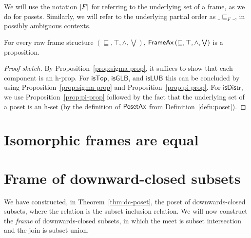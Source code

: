 We will use the notation $\left| F \right|$ for referring to the underlying set of a frame, as we
do for posets. Similarly, we will refer to the underlying partial order as $\_\sqsubseteq_F\_$, in
possibly ambiguous contexts.

\begin{prop}
  For every raw frame structure $(\sqsubseteq, \top, \wedge, \bigvee)$, $\mathsf{FrameAx}\left(\sqsubseteq, \top, \wedge, \bigvee\right)$ is a proposition.
\end{prop}
\begin{proof}[Proof sketch]
  By Proposition~\ref{prop:sigma-prop}, it suffices to show that each component is an
  h-prop. For $\mathsf{isTop}$, $\mathsf{isGLB}$, and $\mathsf{isLUB}$ this can be
  concluded by using Proposition~\ref{prop:sigma-prop} and Proposition~\ref{prop:pi-prop}.
  For $\mathsf{isDistr}$, we use Proposition~\ref{prop:pi-prop} followed by the fact that
  the underlying set of a poset is an h-set (by the definition of $\mathsf{PosetAx}{}$ from
  Definition~\ref{defn:poset}).
\end{proof}

\section{Isomorphic frames are equal}\label{sec:frame-univ}


\section{Frame of downward-closed subsets}\label{sec:down-set-frame}

We have constructed, in Theorem~\ref{thm:dc-poset}, the poset of downwards-closed subsets,
where the relation is the subset inclusion relation. We will now construct the
\emph{frame} of downwards-closed subsets, in which the meet is subset intersection and the
join is subset union.

